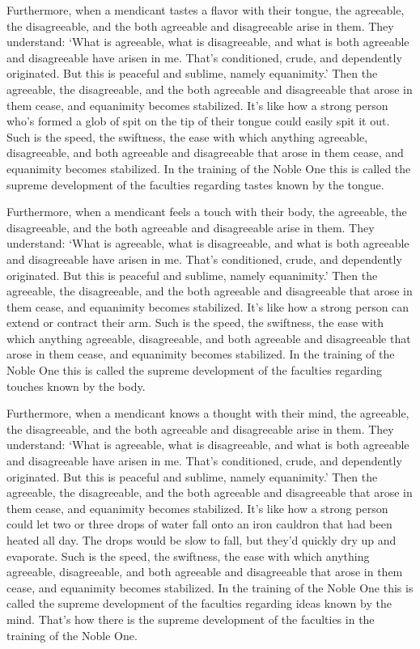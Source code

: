 \documentclass[12pt,openany]{book}%
\begin{document}
Furthermore, when a mendicant tastes a flavor with their tongue, the agreeable, the disagreeable, and the both agreeable and disagreeable arise in them. They understand: ‘What is agreeable, what is disagreeable, and what is both agreeable and disagreeable have arisen in me. That’s conditioned, crude, and dependently originated. But this is peaceful and sublime, namely equanimity.’ Then the agreeable, the disagreeable, and the both agreeable and disagreeable that arose in them cease, and equanimity becomes stabilized. It’s like how a strong person who’s formed a glob of spit on the tip of their tongue could easily spit it out. Such is the speed, the swiftness, the ease with which anything agreeable, disagreeable, and both agreeable and disagreeable that arose in them cease, and equanimity becomes stabilized. In the training of the Noble One this is called the supreme development of the faculties regarding tastes known by the tongue. 

Furthermore, when a mendicant feels a touch with their body, the agreeable, the disagreeable, and the both agreeable and disagreeable arise in them. They understand: ‘What is agreeable, what is disagreeable, and what is both agreeable and disagreeable have arisen in me. That’s conditioned, crude, and dependently originated. But this is peaceful and sublime, namely equanimity.’ Then the agreeable, the disagreeable, and the both agreeable and disagreeable that arose in them cease, and equanimity becomes stabilized. It’s like how a strong person can extend or contract their arm. Such is the speed, the swiftness, the ease with which anything agreeable, disagreeable, and both agreeable and disagreeable that arose in them cease, and equanimity becomes stabilized. In the training of the Noble One this is called the supreme development of the faculties regarding touches known by the body. 

Furthermore, when a mendicant knows a thought with their mind, the agreeable, the disagreeable, and the both agreeable and disagreeable arise in them. They understand: ‘What is agreeable, what is disagreeable, and what is both agreeable and disagreeable have arisen in me. That’s conditioned, crude, and dependently originated. But this is peaceful and sublime, namely equanimity.’ Then the agreeable, the disagreeable, and the both agreeable and disagreeable that arose in them cease, and equanimity becomes stabilized. It’s like how a strong person could let two or three drops of water fall onto an iron cauldron that had been heated all day. The drops would be slow to fall, but they’d quickly dry up and evaporate. Such is the speed, the swiftness, the ease with which anything agreeable, disagreeable, and both agreeable and disagreeable that arose in them cease, and equanimity becomes stabilized. In the training of the Noble One this is called the supreme development of the faculties regarding ideas known by the mind. That’s how there is the supreme development of the faculties in the training of the Noble One. 
\end{document}
